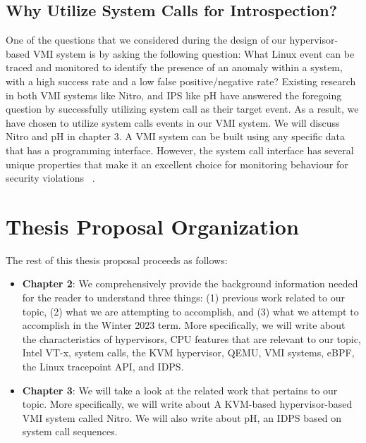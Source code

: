 \documentclass{report}
\begin{document}
\begin{spacing}{1.5}
\subsection{Why Utilize System Calls for Introspection?}

{\large
One of the questions that we considered during the design of our hypervisor-based VMI system is by asking the following question: What Linux event can be traced and monitored to identify the presence of an anomaly within a system, with a high success rate and a low false positive/negative rate? Existing research in both VMI systems like Nitro, and IPS like pH have answered the foregoing question by successfully utilizing system call as their target event. As a result, we have chosen to utilize system calls events in our VMI system. We will discuss Nitro and pH in chapter 3. A VMI system can be built using any specific data that has a programming interface. However, the system call interface has several unique properties that make it an excellent choice for monitoring behaviour for security violations ~\cite{somayaji2002operating}.
\newline
}


















\section{Thesis Proposal Organization}
{\large
The rest of this thesis proposal proceeds as follows:

\begin{itemize}
    \item \textbf{Chapter 2}: We comprehensively provide the background information needed for the reader to understand three things: (1) previous work related to our topic, (2) what we are attempting to accomplish, and (3) what we attempt to accomplish in the Winter 2023 term. More specifically, we will write about the characteristics of hypervisors, CPU features that are relevant to our topic, Intel VT-x, system calls, the KVM hypervisor, QEMU, VMI systems, eBPF, the Linux tracepoint API, and IDPS.

    \item \textbf{Chapter 3}: We will take a look at the related work that pertains to our topic. More specifically, we will write about A KVM-based hypervisor-based VMI system called Nitro. We will also write about pH, an IDPS based on system call sequences.


\end{itemize}}
\end{spacing}
\end{document}
